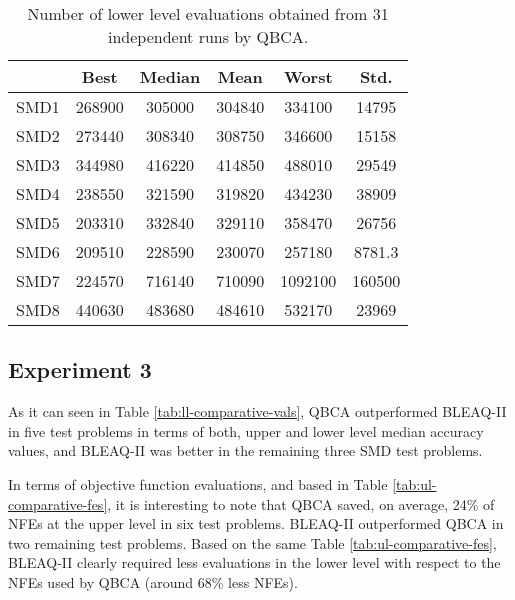 \documentclass[conference]{IEEEtran}
\theoremstyle{definition}
\begin{document}
\begin{table}[!ht]
    \caption{Number of lower level evaluations obtained from 31 independent runs by QBCA.}
    \label{tab:ll-evals}
    \centering
    \begin{tabular}{cccccc}
        \hline
        & Best &  Median &  Mean &  Worst &  Std. \\ \hline
        SMD1 & 268900 & 305000 & 304840 & 334100 & 14795 \\ \hline 
        SMD2 & 273440 & 308340 & 308750 & 346600 & 15158 \\ \hline 
        SMD3 & 344980 & 416220 & 414850 & 488010 & 29549 \\ \hline 
        SMD4 & 238550 & 321590 & 319820 & 434230 & 38909 \\ \hline 
        SMD5 & 203310 & 332840 & 329110 & 358470 & 26756 \\ \hline 
        SMD6 & 209510 & 228590 & 230070 & 257180 & 8781.3 \\ \hline 
        SMD7 & 224570 & 716140 & 710090 & 1092100 & 160500 \\ \hline 
        SMD8 & 440630 & 483680 & 484610 & 532170 & 23969 \\ \hline 
    \end{tabular}
\end{table}


\subsection{Experiment 3}
As it can seen in Table \ref{tab:ll-comparative-vals}, QBCA outperformed BLEAQ-II
in five test problems in terms of both, upper and lower level median accuracy
values, and BLEAQ-II was better in the remaining three SMD test problems. 

In terms of objective function evaluations, and based in Table \ref{tab:ul-comparative-fes},
it is interesting to note that QBCA saved, on average, 24\% of NFEs at the upper
level in six test problems. BLEAQ-II outperformed QBCA in two remaining test
problems. Based on the same Table \ref{tab:ul-comparative-fes}, BLEAQ-II clearly
required less evaluations in the lower level with respect to the NFEs used by
QBCA (around 68\% less NFEs). 
\end{document}
